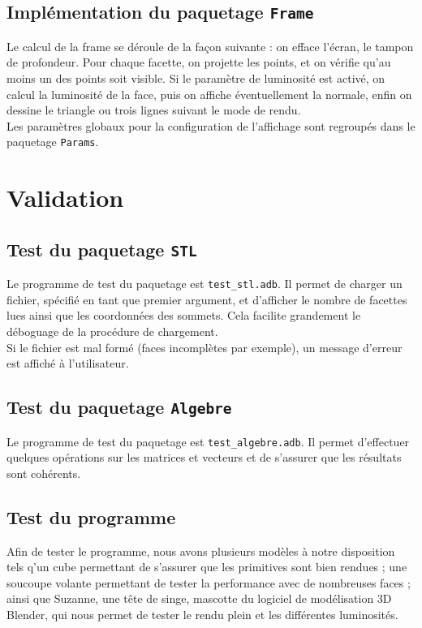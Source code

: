 \documentclass[10pt]{article}
\begin{document}
\subsection{Implémentation du paquetage {\tt Frame}}
Le calcul de la frame se déroule de la façon suivante : on efface l'écran, le tampon de profondeur. Pour chaque facette, on projette les points, et on vérifie qu'au moins un des points soit visible. Si le paramètre de luminosité est activé, on calcul la luminosité de la face, puis on affiche éventuellement la normale, enfin on dessine le triangle ou trois lignes suivant le mode de rendu. \\
Les paramètres globaux pour la configuration de l'affichage sont regroupés dans le paquetage {\tt Params}.





\section{Validation}

\subsection{Test du paquetage {\tt STL}}

Le programme de test du paquetage est \verb!test_stl.adb!. Il permet de charger un fichier, spécifié en tant que premier argument, et d'afficher le nombre de facettes lues ainsi que les coordonnées des sommets. Cela facilite grandement le déboguage de la procédure de chargement.\\
Si le fichier est mal formé (faces incomplètes par exemple), un message d'erreur est affiché à l'utilisateur.

\subsection{Test du paquetage {\tt Algebre}}
Le programme de test du paquetage est \verb!test_algebre.adb!. Il permet d'effectuer quelques opérations sur les matrices et vecteurs et de s'assurer que les résultats sont cohérents.


\subsection{Test du programme}

Afin de tester le programme, nous avons plusieurs modèles à notre disposition tels q'un cube permettant de s'assurer que les primitives sont bien rendues ; une soucoupe volante permettant de tester la performance avec de nombreuses faces ; ainsi que Suzanne, une tête de singe, mascotte du logiciel de modélisation 3D Blender, qui nous permet de tester le rendu plein et les différentes luminosités.
\end{document}
